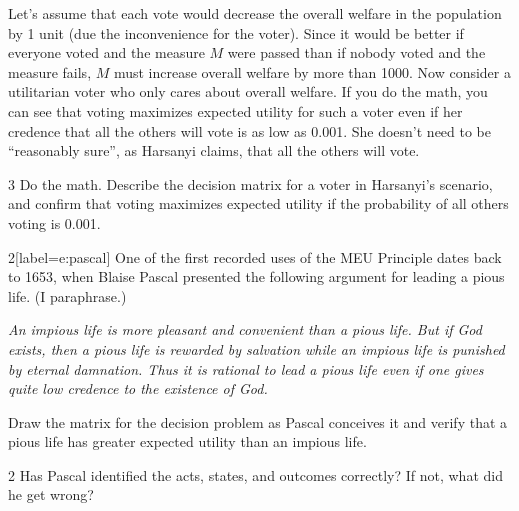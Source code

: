 Let's assume that each vote would decrease the overall welfare in the population
by 1 unit (due the inconvenience for the voter). Since it would be better if
everyone voted and the measure $M$ were passed than if nobody voted and the
measure fails, $M$ must increase overall welfare by more than 1000. Now consider
a utilitarian voter who only cares about overall welfare. If you do the math,
you can see that voting maximizes expected utility for such a voter even if
her credence that all the others will vote is as low as 0.001. She doesn't
need to be ``reasonably sure'', as Harsanyi claims, that all the others will
vote.

\begin{exercise}{3}
  Do the math. Describe the decision matrix for a voter in Harsanyi's scenario,
  and confirm that voting maximizes expected utility if the probability of all
  others voting is 0.001.
\end{exercise}

\begin{exercise}{2}[label=e:pascal]
  One of the first recorded uses of the MEU Principle dates back to 1653, when
  Blaise Pascal presented the following argument for leading a pious life. (I
  paraphrase.)

  \smallskip

  \emph{An impious life is more pleasant and convenient than a
    pious life. But if God exists, then a pious life is rewarded by
    salvation while an impious life is punished by eternal
    damnation. Thus it is rational to lead a pious life even if one
    gives quite low credence to the existence of God.}

  \smallskip
  
  Draw the matrix for the decision problem as Pascal conceives it and
  verify that a pious life has greater expected utility than an
  impious life.
\end{exercise}

\begin{exercise}{2}
  Has Pascal identified the acts, states, and outcomes correctly? If
  not, what did he get wrong?
\end{exercise}



